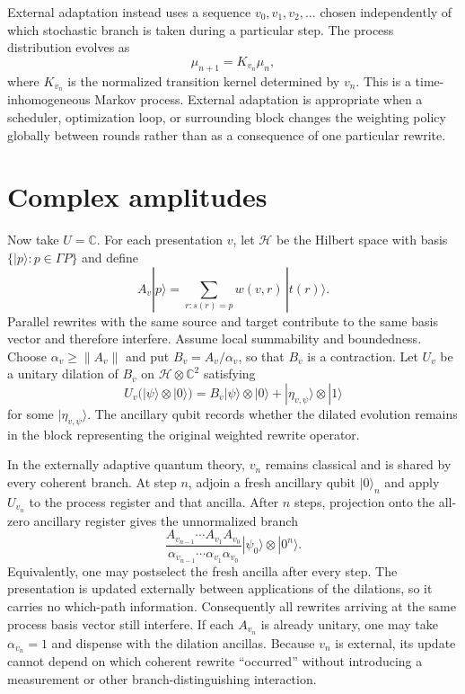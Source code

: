 \documentclass[10pt]{article}
\newcommand{\C}{\mathbb{C}}
\newcommand{\Hh}{\mathcal{H}}
\begin{document}
External adaptation instead uses a sequence $v_0,v_1,v_2,\ldots$ chosen
independently of which stochastic branch is taken during a particular step.
The process distribution evolves as
\[
\mu_{n+1}=K_{v_n}\mu_n,
\]
where $K_{v_n}$ is the normalized transition kernel determined by $v_n$.
This is a time-inhomogeneous Markov process.  External adaptation is appropriate
when a scheduler, optimization loop, or surrounding block changes the weighting
policy globally between rounds rather than as a consequence of one particular
rewrite.

\section*{Complex amplitudes}

Now take $U=\C$.  For each presentation $v$, let $\Hh$ be the Hilbert space
with basis $\{|p\rangle:p\in\Gamma P\}$ and define
\[
A_v|p\rangle
=
\sum_{r:s(r)=p}w(v,r)\,|t(r)\rangle.
\]
Parallel rewrites with the same source and target contribute to the same basis
vector and therefore interfere.  Assume local summability and boundedness.
Choose $\alpha_v\geq\|A_v\|$ and put $B_v=A_v/\alpha_v$, so that $B_v$ is a
contraction.  Let $U_v$ be a unitary dilation of $B_v$ on
$\Hh\otimes\C^2$ satisfying
\[
U_v\bigl(|\psi\rangle\otimes|0\rangle\bigr)
=
B_v|\psi\rangle\otimes|0\rangle
+|\eta_{v,\psi}\rangle\otimes|1\rangle
\]
for some $|\eta_{v,\psi}\rangle$.  The ancillary qubit records whether the
dilated evolution remains in the block representing the original weighted
rewrite operator.

In the externally adaptive quantum theory, $v_n$ remains classical and is
shared by every coherent branch.  At step $n$, adjoin a fresh ancillary qubit
$|0\rangle_n$ and apply $U_{v_n}$ to the process register and that ancilla.
After $n$ steps, projection onto the all-zero ancillary register gives the
unnormalized branch
\[
\frac{A_{v_{n-1}}\cdots A_{v_1}A_{v_0}}
{\alpha_{v_{n-1}}\cdots\alpha_{v_1}\alpha_{v_0}}
|\psi_0\rangle\otimes|0^n\rangle.
\]
Equivalently, one may postselect the fresh ancilla after every step.  The
presentation is updated externally between applications of the dilations, so
it carries no which-path information.  Consequently all rewrites arriving at
the same process basis vector still interfere.  If each $A_{v_n}$ is already
unitary, one may take $\alpha_{v_n}=1$ and dispense with the dilation ancillas.
Because $v_n$ is external, its update cannot depend on which coherent rewrite
``occurred'' without introducing a measurement or other branch-distinguishing
interaction.
\end{document}
